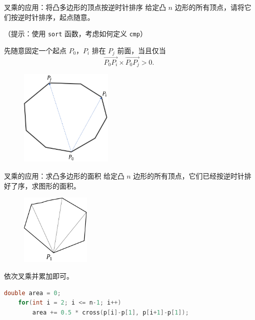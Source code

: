 \documentclass{beamer}
\begin{document}
\begin{frame}[fragile]{叉乘的应用：将凸多边形的顶点按逆时针排序}
    给定凸 $n$ 边形的所有顶点，请将它们按逆时针排序，起点随意。

    （提示：使用 \verb|sort| 函数，考虑如何定义 \verb|cmp|）

    \vspace{1em}\pause
    先随意固定一个起点 $P_0$，$P_i$ 排在 $P_j$ 前面，当且仅当
    \begin{equation*}
        \overrightarrow{P_0P_i} \times \overrightarrow{P_0P_j} > 0.
    \end{equation*}

    \begin{figure}
        \centering
        \includegraphics[width=0.4\textwidth]{pic/sort.png}
    \end{figure}
\end{frame}


\begin{frame}[fragile]{叉乘的应用：求凸多边形的面积}
    给定凸 $n$ 边形的所有顶点，它们已经按逆时针排好了序，求图形的面积。

    \vspace{1em}\pause
    \begin{figure}
        \centering
        \includegraphics[width=0.3\textwidth]{pic/area.png}
    \end{figure}
    依次叉乘并累加即可。
\begin{lstlisting}[language=c++]
    double area = 0;
    for(int i = 2; i <= n-1; i++)
        area += 0.5 * cross(p[i]-p[1], p[i+1]-p[1]);
\end{lstlisting}
\end{frame}
\end{document}
